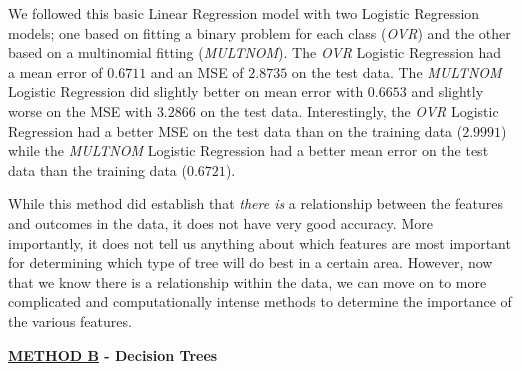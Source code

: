 \documentclass{article}[12pt]
\numberwithin{equation}{subsection}
\begin{document}
\begin{flushleft}
We followed this basic Linear Regression model with two Logistic Regression models; one based on fitting a binary problem for each class (\emph{OVR}) and the other based on a multinomial fitting (\emph{MULTNOM}).  The \emph{OVR} Logistic Regression had a mean error of $0.6711$ and an MSE of $2.8735$ on the test data.  The \emph{MULTNOM} Logistic Regression did slightly better on mean error with $0.6653$ and slightly worse on the MSE with $3.2866$ on the test data.  Interestingly, the \emph{OVR} Logistic Regression had a better MSE on the test data than on the training data ($2.9991$) while the \emph{MULTNOM} Logistic Regression had a better mean error on the test data than the training data ($0.6721$). \newline

While this method did establish that \emph{there is} a relationship between the features and outcomes in the data, it does not have very good accuracy.  More importantly, it does not tell us anything about which features are most important for determining which type of tree will do best in a certain area.  However, now that we know there is a relationship within the data, we can move on to more complicated and computationally intense methods to determine the importance of the various features.


\vspace{0.5in}

\begin{large} \textbf{\underline{METHOD B} - Decision Trees} \end{large}




























































\end{flushleft}
\end{document}
